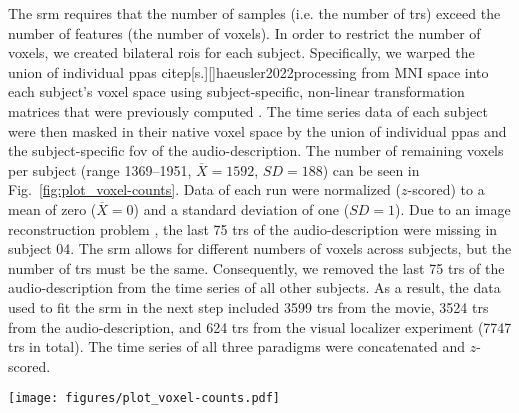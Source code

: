 
The \ac{srm} requires that the number of samples (i.e. the number of \acp{tr})
exceed the number of features (the number of voxels).
%
In order to restrict the number of voxels, we created bilateral \acp{roi} for
each subject.
%
Specifically, we warped the union of individual \acp{ppa}
citep[s.][]{haeusler2022processing} from MNI space into each subject's voxel
space using subject-specific, non-linear transformation matrices that were
previously computed
\citep[][\href{https://github.com/psychoinformatics-de/studyforrest-data-templatetransforms
}{\url{github.com/psychoinformatics-de/studyforrest-data-templatetransforms}}]{hanke2014audiomovie}.
The time series data of each subject were then masked in their native voxel
space by the union of individual \acp{ppa} and the subject-specific \ac{fov} of
the audio-description.
The number of remaining voxels per subject (range 1369--1951,
$\overline{X}=1592$, $SD=188$) can be seen in Fig.~\ref{fig:plot_voxel-counts}.
Data of each run were normalized ($z$-scored) to a mean of zero
($\overline{X}=0$) and a standard deviation of one ($SD=1$).
%
Due to an image reconstruction problem \citep[s.][]{hanke2014audiomovie}, the
last 75 \acp{tr} of the audio-description were missing in subject 04.
%
The \ac{srm} allows for different numbers of voxels across subjects, but the
number of \acp{tr} must be the same.
%
Consequently, we removed the last 75 \acp{tr} of the audio-description from the
time series of all other subjects.
As a result, the data used to fit the \ac{srm} in the next step included 3599
\acp{tr} from the movie, 3524 \acp{tr} from the audio-description, and 624
\acp{tr} from the visual localizer experiment (7747 \acp{tr} in total).
The time series of all three paradigms were concatenated and $z$-scored.

\begin{figure*}[tbp]
\centering
\texttt{[image: figures/plot\_voxel-counts.pdf]}
\caption{
%
\textbf{Number of voxels in the bilateral regions of interest (ROIs)
of each subject.}
%
In order to reduce the number of voxels, we warped the union of
individual \acp{ppa} \citep[cf. Fig. 1 in][]{haeusler2022processing} from
MNI152 space into each subject's native voxel space.
%
The remaining voxels of each subject were further constrained to those
voxels that are included in the respective subject's \ac{fov} of the
audio-description \citep[cf.][]{hanke2014audiomovie}.
}
\label{fig:plot_voxel-counts}
\end{figure*}


